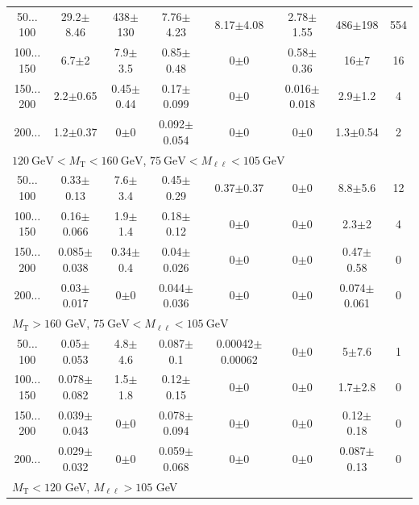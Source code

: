 \begin{table}
\begin{center}
\begin{tabular}{| c | c c c c c c c | }
50$\dots$100&29.2$\pm$8.46&438$\pm$130&7.76$\pm$4.23&8.17$\pm$4.08&2.78$\pm$1.55&486$\pm$198&554\\
100$\dots$150&6.7$\pm$2&7.9$\pm$3.5&0.85$\pm$0.48&0$\pm$0&0.58$\pm$0.36&16$\pm$7&16\\
150$\dots$200&2.2$\pm$0.65&0.45$\pm$0.44&0.17$\pm$0.099&0$\pm$0&0.016$\pm$0.018&2.9$\pm$1.2&4\\
200$\dots$&1.2$\pm$0.37&0$\pm$0&0.092$\pm$0.054&0$\pm$0&0$\pm$0&1.3$\pm$0.54&2\\
\hline\hline
\multicolumn{8}{l}{$120~\mathrm{GeV} < M_{\text{T}} < 160~\mathrm{GeV}$, $75~\mathrm{GeV} < M_{\ell\ell} < 105~\mathrm{GeV}$}\\\hline\hline
50$\dots$100&0.33$\pm$0.13&7.6$\pm$3.4&0.45$\pm$0.29&0.37$\pm$0.37&0$\pm$0&8.8$\pm$5.6&12\\
100$\dots$150&0.16$\pm$0.066&1.9$\pm$1.4&0.18$\pm$0.12&0$\pm$0&0$\pm$0&2.3$\pm$2&4\\
150$\dots$200&0.085$\pm$0.038&0.34$\pm$0.4&0.04$\pm$0.026&0$\pm$0&0$\pm$0&0.47$\pm$0.58&0\\
200$\dots$&0.03$\pm$0.017&0$\pm$0&0.044$\pm$0.036&0$\pm$0&0$\pm$0&0.074$\pm$0.061&0\\
\hline\hline
\multicolumn{8}{l}{$M_{\text{T}} > 160$ GeV, $75~\mathrm{GeV} < M_{\ell\ell} < 105~\mathrm{GeV}$}\\\hline\hline
50$\dots$100&0.05$\pm$0.053&4.8$\pm$4.6&0.087$\pm$0.1&0.00042$\pm$0.00062&0$\pm$0&5$\pm$7.6&1\\
100$\dots$150&0.078$\pm$0.082&1.5$\pm$1.8&0.12$\pm$0.15&0$\pm$0&0$\pm$0&1.7$\pm$2.8&0\\
150$\dots$200&0.039$\pm$0.043&0$\pm$0&0.078$\pm$0.094&0$\pm$0&0$\pm$0&0.12$\pm$0.18&0\\
200$\dots$&0.029$\pm$0.032&0$\pm$0&0.059$\pm$0.068&0$\pm$0&0$\pm$0&0.087$\pm$0.13&0\\
\hline\hline
\multicolumn{8}{l}{$M_{\text{T}} < 120$ GeV, $M_{\ell\ell} > 105$ GeV}\\\hline\hline

\end{tabular}
\end{center}
\end{table}
